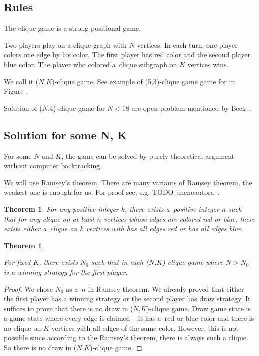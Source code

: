 \subsection{Rules}

The clique game is a strong positional game. 

Two players play on a clique graph with
$N$ vertices. In each turn, one player colors one edge by his color. The first
player has red color and the second player blue color. The player who colored
a~clique subgraph on $K$ vertices wins. 

We call it ($N$,$K$)-clique game.
See example of (5,3)-clique game game for in Figure .

Solution of ($N$,4)-clique game for $N < 18$ are open problem mentioned
by Beck~\cite{beck}.

\subsection{Solution for some N, K}

For some $N$ and $K$, the game can be solved by purely theoretical argument
without computer backtracking.

We will use Ramsey's theorem. There are many variants of Ramsey theorem, the weakest
one is enough for us. For proof see, e.g. TODO jmenoautora~\cite{ramsey}. 

\newtheorem{ramsey}{Theorem} 
\begin{ramsey} 
	
For any positive integer $k$, there exists a~positive integer $n$ such that for
any clique on at least $n$ vertices whose edges are colored red or blue, there
exists either a~clique on $k$ vertices with has all edges red or has all edges
blue.

\end{ramsey}

\newtheorem{solution}{Theorem} 
\begin{solution} \label{solution} 
	
For fixed $K$, there exists $N_0$ such that in each ($N$,$K$)-clique game where
$N > N_0$ is a winning strategy for the first player.  

\end{solution}
\begin{proof} 
	
We chose $N_0$ as a~$n$ in Ramsey theorem. We already proved that either the
first player has a winning strategy or the second player has draw strategy. It
suffices to prove that there is no draw in ($N$,$K$)-clique game. Draw game
state is a game state where every edge is claimed -- it has a~red or blue color
and there is no clique on $K$ vertices with all edges of the same color.
However, this is not possible since according to the Ramsey's theorem, there is
always such a clique. So there is no draw in ($N$,$K$)-clique game.

\end{proof}

